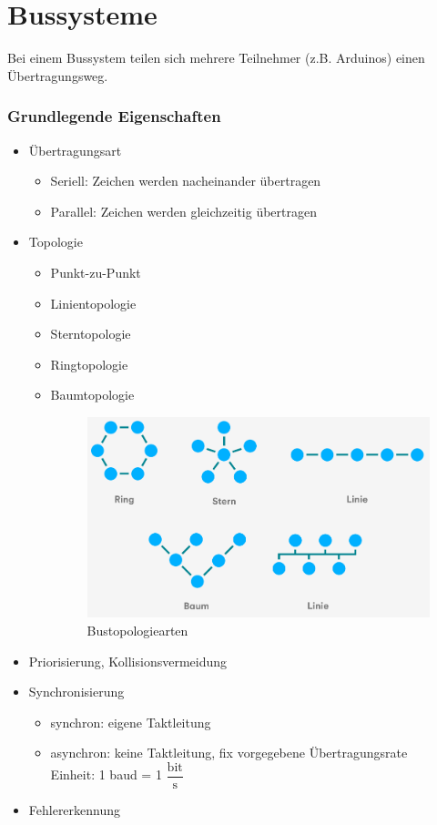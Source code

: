 \chapter{Bussysteme}
Bei einem Bussystem teilen sich mehrere Teilnehmer (z.B. Arduinos) einen Übertragungsweg.

\subsection*{Grundlegende Eigenschaften}
\begin{itemize}
	\item Übertragungsart
	\begin{itemize}
		\item Seriell: Zeichen werden nacheinander übertragen
		\item Parallel: Zeichen werden gleichzeitig übertragen
	\end{itemize}
	\item Topologie
	\begin{itemize}
		\item Punkt-zu-Punkt
		\item Linientopologie
		\item Sterntopologie
		\item Ringtopologie
		\item Baumtopologie
		\begin{figure}[H]
			\centering
			\includegraphics[width=0.7\linewidth]{figures/topo.png}
			\caption{Bustopologiearten}
		\end{figure}
	\end{itemize}
	\item Priorisierung, Kollisionsvermeidung
	\item Synchronisierung
	\begin{itemize}
		\item synchron: eigene Taktleitung
		\item asynchron: keine Taktleitung, fix vorgegebene Übertragungsrate \\
		Einheit: 1 baud = 1 $\dfrac{\text{bit}}{\text{s}}$
	\end{itemize}
	\item Fehlererkennung
\end{itemize}

